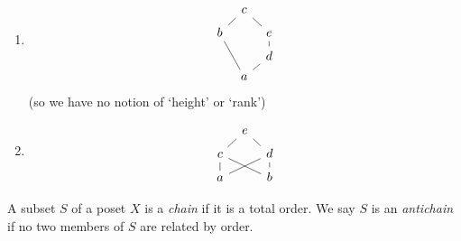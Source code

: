 \documentclass[a3paper, 10pt]{article}
\newcommand{\enumpre}{}
\renewcommand{\vocab}[1]{\emph{#1}}
\begin{document}
\begin{multicols*}{5}
\begin{example}~
  \enumpre
  \begin{enumerate}
    \item %
    \[\begin{tikzcd}[sep=tiny]
      & c \\
      b && e \\
      && d \\
      & a
      \arrow[no head, from=4-2, to=2-1]
      \arrow[no head, from=2-1, to=1-2]
      \arrow[no head, from=4-2, to=3-3]
      \arrow[no head, from=3-3, to=2-3]
      \arrow[no head, from=2-3, to=1-2]
    \end{tikzcd}\]
    (so we have no notion of `height' or `rank')
  \item %
  \[\begin{tikzcd}[sep=tiny]
    & e \\
    c && d \\
    a && b
    \arrow[no head, from=3-1, to=2-3]
    \arrow[no head, from=3-1, to=2-1]
    \arrow[no head, from=2-1, to=1-2]
    \arrow[no head, from=2-3, to=1-2]
    \arrow[no head, from=3-3, to=2-3]
    \arrow[no head, from=3-3, to=2-1]
  \end{tikzcd}\]
  \end{enumerate}
\end{example}

\begin{definition}[Chain]
  A subset $S$ of a poset $X$ is a \vocab{chain} if it is a total order. 
  We say $S$ is an \vocab{antichain} if no two members of $S$ are related by order.
\end{definition}


\end{multicols*}
\end{document}
